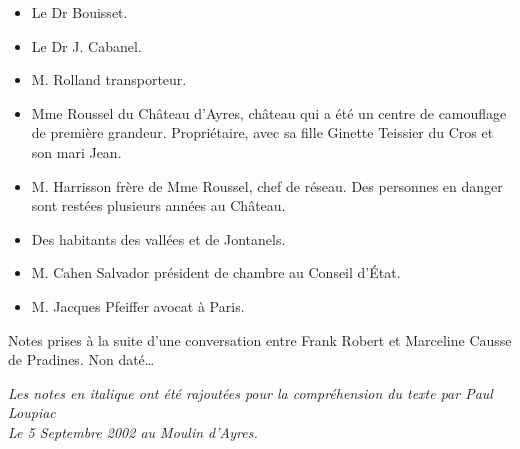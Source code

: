 \begin{itemize}
\item Le Dr Bouisset.
\item Le Dr J. Cabanel.
\item M. Rolland transporteur.
\item Mme Roussel du Château d’Ayres, château qui a été un centre de camouflage de première grandeur. Propriétaire, avec sa fille Ginette Teissier du Cros et son mari Jean.
\item M. Harrisson frère de Mme Roussel, chef de réseau. Des personnes en danger sont restées plusieurs années au Château.
\item Des habitants des vallées et de Jontanels.
\item M. Cahen Salvador président de chambre au Conseil d’État.
\item M. Jacques Pfeiffer avocat à Paris.
\end{itemize}

Notes prises à la suite d’une conversation entre Frank Robert et Marceline Causse de
Pradines. Non daté…

\textit{Les notes en italique ont été rajoutées pour la compréhension du texte par Paul Loupiac\\
Le 5 Septembre 2002 au Moulin d’Ayres.}


